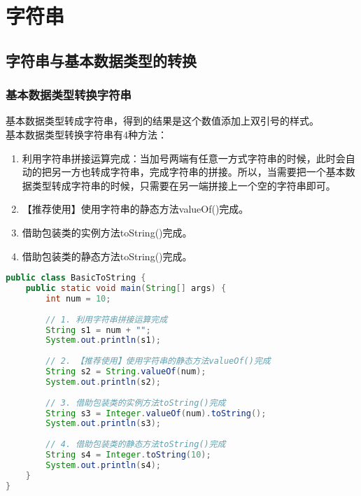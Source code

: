 \chapter{字符串}

\section{字符串与基本数据类型的转换}

\subsection{基本数据类型转换字符串}

基本数据类型转成字符串，得到的结果是这个数值添加上双引号的样式。\\

基本数据类型转换字符串有4种方法：

\begin{enumerate}
	\item 利用字符串拼接运算完成：当加号两端有任意一方式字符串的时候，此时会自动的把另一方也转成字符串，完成字符串的拼接。所以，当需要把一个基本数据类型转成字符串的时候，只需要在另一端拼接上一个空的字符串即可。

	\item 【推荐使用】使用字符串的静态方法valueOf()完成。

	\item 借助包装类的实例方法toString()完成。

	\item 借助包装类的静态方法toString()完成。
\end{enumerate}

\vspace{0.5cm}


\begin{lstlisting}[language=Java]
public class BasicToString {
    public static void main(String[] args) {
        int num = 10;
        
        // 1. 利用字符串拼接运算完成
        String s1 = num + "";
        System.out.println(s1);
        
        // 2. 【推荐使用】使用字符串的静态方法valueOf()完成
        String s2 = String.valueOf(num);
        System.out.println(s2);
        
        // 3. 借助包装类的实例方法toString()完成
        String s3 = Integer.valueOf(num).toString();
        System.out.println(s3);
        
        // 4. 借助包装类的静态方法toString()完成
        String s4 = Integer.toString(10);
        System.out.println(s4);
    }
}
\end{lstlisting}

